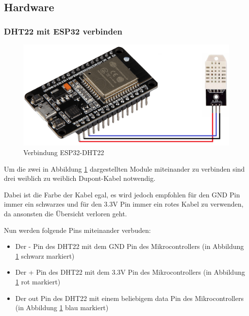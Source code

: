 \subsection{Hardware}

\subsubsection{DHT22 mit ESP32 verbinden}
\begin{figure}[H]
    \begin{center}
        \includegraphics[scale=0.36]{images/DHT22-ESP32-Connection.png}
        \caption{Verbindung ESP32-DHT22 \cite{dht22_picture, nodemcu_picture_joy-it}}
        \label{abb:esp32-dht22}
    \end{center}
\end{figure}

Um die zwei in Abbildung \ref{abb:esp32-dht22} dargestellten Module miteinander zu verbinden sind drei weiblich zu weiblich Dupont-Kabel notwendig.

Dabei ist die Farbe der Kabel egal, es wird jedoch empfohlen für den GND Pin immer ein schwarzes und für den 3.3V Pin immer ein rotes Kabel zu verwenden, da ansonsten die Übersicht verloren geht. 

Nun werden folgende Pins miteinander verbuden:
\begin{itemize}
    \item Der - Pin des DHT22 mit dem GND Pin des Mikrocontrollers (in Abbildung \ref{abb:esp32-dht22} schwarz markiert)
    \item Der + Pin des DHT22 mit dem 3.3V Pin des Mikrocontrollers (in Abbildung \ref{abb:esp32-dht22} rot markiert)
    \item Der out Pin des DHT22 mit einem beliebigem data Pin des Mikrocontrollers (in Abbildung \ref{abb:esp32-dht22} blau markiert)
\end{itemize}
\pagebreak

